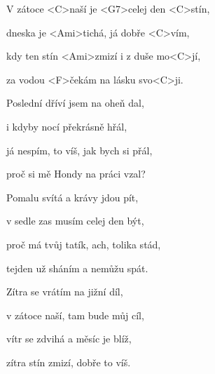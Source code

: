 

\zs
V zátoce <C>naší je <G7>celej den <C>stín,

dneska je <Ami>tichá, já dobře <C>vím,

kdy ten stín <Ami>zmizí i z duše mo<C>jí,

za vodou <F>čekám na lásku svo<C>ji.
\ks

\zs
Poslední dříví jsem na oheň dal,

i kdyby nocí překrásně hřál,

já nespím, to víš, jak bych si přál,

proč si mě Hondy na práci vzal?
\ks

\zs
Pomalu svítá a krávy jdou pít,

v sedle zas musím celej den být,

proč má tvůj tatík, ach, tolika stád,

tejden už sháním a nemůžu spát.
\ks

\zs
Zítra se vrátím na jižní díl,

v zátoce naší, tam bude můj cíl,

vítr se zdvihá a měsíc je blíž,

zítra stín zmizí, dobře to víš.
\ks

\kp
